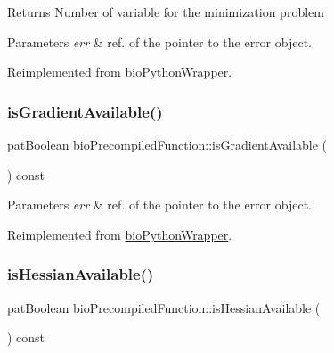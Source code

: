 \begin{DoxyReturn}{Returns}
Number of variable for the minimization problem 
\end{DoxyReturn}

\begin{DoxyParams}{Parameters}
{\em err} & ref. of the pointer to the error object. \\
\hline
\end{DoxyParams}


Reimplemented from \hyperlink{classbio_python_wrapper_a63991abdfaca07aca3757e96cd06410d}{bio\+Python\+Wrapper}.

\mbox{\label{classbio_precompiled_function_a50c940f1d46f4ed75a4e54fbe425d11f}} 
\subsubsection{\texorpdfstring{is\+Gradient\+Available()}{isGradientAvailable()}}
{\footnotesize\ttfamily pat\+Boolean bio\+Precompiled\+Function\+::is\+Gradient\+Available (\begin{DoxyParamCaption}{ }\end{DoxyParamCaption}) const\hspace{0.3cm}{\ttfamily [virtual]}}


\begin{DoxyParams}{Parameters}
{\em err} & ref. of the pointer to the error object. \\
\hline
\end{DoxyParams}


Reimplemented from \hyperlink{classbio_python_wrapper_a1e8391dbed1fd49c04a042b9e15dec71}{bio\+Python\+Wrapper}.

\mbox{\label{classbio_precompiled_function_aaa821c6546652dd085391c4f2199c97a}} 
\subsubsection{\texorpdfstring{is\+Hessian\+Available()}{isHessianAvailable()}}
{\footnotesize\ttfamily pat\+Boolean bio\+Precompiled\+Function\+::is\+Hessian\+Available (\begin{DoxyParamCaption}{ }\end{DoxyParamCaption}) const\hspace{0.3cm}{\ttfamily [virtual]}}


